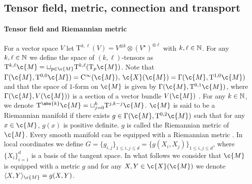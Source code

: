 \subsection{Tensor field, metric, connection and transport}
\label{sec:metr-conn-tens}

\paragraph{Tensor field and Riemannian metric}

For a vector space $V$ let $\mathrm{T}^{k, \ell}(V) = V^{\otimes k} \otimes (V^\star)^{\otimes \ell}$ with $k, \ell \in \mathbb{N}$.
For any $k, \ell \in \mathbb{N}$ we define the space of $(k,\ell)$-tensors as $\mathrm{T}^{k,\ell} \c{M} = \sqcup_{p \in \c{M}} \mathrm{T}^{k,\ell}(\mathrm{T}_p\c{M})$.
Note that $\Gamma(\c{M}, \mathrm{T}^{0,0}\c{M}) = \mathrm{C}^\infty(\c{M})$, $\c{X}(\c{M}) = \Gamma(\c{M}, \mathrm{T}^{1,0} \c{M})$ and that the space of $1$-form on $\c{M}$ is given by $\Gamma(\c{M}, \mathrm{T}^{0,1} \c{M})$, where $\Gamma(\c{M}, V(\c{M}))$ is a section of a vector bundle $V(\c{M})$ \parencite[see][Chapter 10]{lee2013smooth}.
For any $k \in \mathbb{N}$, we denote $\mathrm{T}^{\abs{k}} \c{M} = \sqcup_{j=0}^k \mathrm{T}^{j,k-j} \c{M}$.
$\c{M}$ is said to be
a Riemannian manifold if there exists $g \in \Gamma(\c{M}, \mathrm{T}^{0,2} \c{M})$ such that for
any $x \in \c{M}$, $g(x)$ is positive definite. $g$ is called the Riemannian metric
of $\c{M}$.
Every smooth manifold can be equipped with a Riemannian metric \cite[see][Proposition 2.4]{lee2018introduction}.
In local coordinates we define $G = \{g_{i,j}\}_{1 \leq i,j \leq d} = \{g(X_i, X_j)\}_{1 \leq i,j \leq d}$, where $\{X_i\}_{i=1}^d$ is a basis of the tangent space.
In what follows we consider that $\c{M}$ is equipped with a metric $g$ and for any $X, Y \in \c{X}(\c{M})$ we denote $\langle X,Y \rangle_{\c{M}} = g(X,Y)$.

